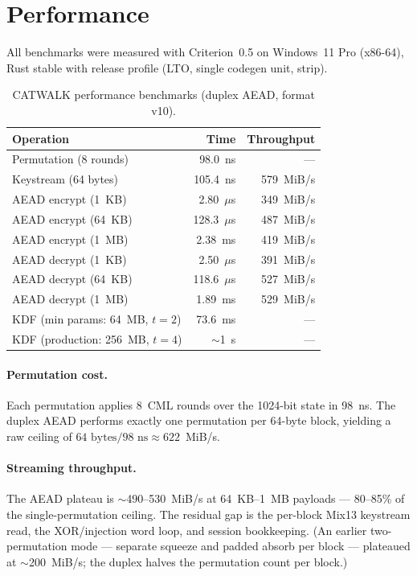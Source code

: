 \documentclass[runningheads]{llncs}
\begin{document}
\section{Performance}
\label{sec:performance}

All benchmarks were measured with Criterion~0.5 on Windows~11 Pro (x86-64),
Rust stable with release profile (LTO, single codegen unit, strip).

\begin{table}[h]
\centering
\caption{CATWALK performance benchmarks (duplex AEAD, format v10).}
\label{tab:performance}
\begin{tabular}{@{}lrr@{}}
\toprule
Operation & Time & Throughput \\
\midrule
Permutation (8 rounds) & 98.0~ns & --- \\
Keystream (64 bytes) & 105.4~ns & 579~MiB/s \\
AEAD encrypt (1~KB) & 2.80~$\mu$s & 349~MiB/s \\
AEAD encrypt (64~KB) & 128.3~$\mu$s & 487~MiB/s \\
AEAD encrypt (1~MB) & 2.38~ms & 419~MiB/s \\
AEAD decrypt (1~KB) & 2.50~$\mu$s & 391~MiB/s \\
AEAD decrypt (64~KB) & 118.6~$\mu$s & 527~MiB/s \\
AEAD decrypt (1~MB) & 1.89~ms & 529~MiB/s \\
KDF (min params: 64~MB, $t\!=\!2$) & 73.6~ms & --- \\
KDF (production: 256~MB, $t\!=\!4$) & $\sim$1~s & --- \\
\bottomrule
\end{tabular}
\end{table}

\paragraph{Permutation cost.}
Each permutation applies 8~CML rounds over the 1024-bit state in 98~ns.
The duplex AEAD performs exactly one permutation per 64-byte block, yielding
a raw ceiling of $64\text{ bytes} / 98\text{ ns} \approx 622$~MiB/s.

\paragraph{Streaming throughput.}
The AEAD plateau is $\sim$490--530~MiB/s at 64~KB--1~MB payloads --- 80--85\%
of the single-permutation ceiling.  The residual gap is the per-block Mix13
keystream read, the XOR/injection word loop, and session bookkeeping.
(An earlier two-permutation mode --- separate squeeze and padded absorb per
block --- plateaued at $\sim$200~MiB/s; the duplex halves the permutation
count per block.)
\end{document}
